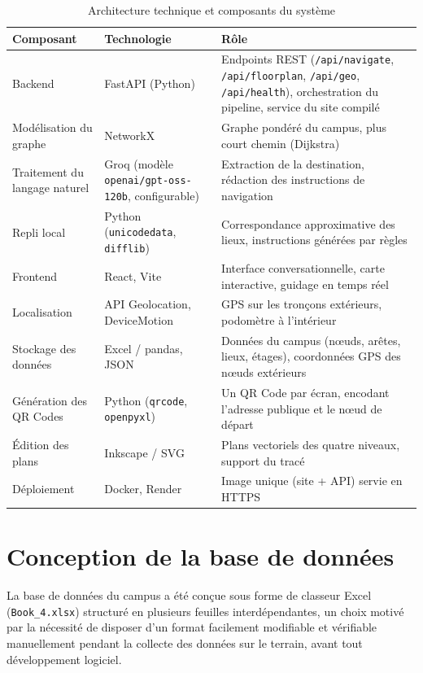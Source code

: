 \documentclass[12pt,a4paper]{report}
\begin{document}
\begin{table}[h]
\centering
\caption{Architecture technique et composants du système}
\label{tab:archi}
\small
\begin{tabularx}{\linewidth}{|p{3.4cm}|p{3.6cm}|X|}
\hline
\textbf{Composant} & \textbf{Technologie} & \textbf{Rôle}\\
\hline
Backend & FastAPI (Python) & Endpoints REST (\texttt{/api/navigate}, \texttt{/api/floorplan}, \texttt{/api/geo}, \texttt{/api/health}), orchestration du pipeline, service du site compilé\\
\hline
Modélisation du graphe & NetworkX & Graphe pondéré du campus, plus court chemin (Dijkstra)\\
\hline
Traitement du langage naturel & Groq (modèle \texttt{openai/gpt-oss-120b}, configurable) & Extraction de la destination, rédaction des instructions de navigation\\
\hline
Repli local & Python (\texttt{unicodedata}, \texttt{difflib}) & Correspondance approximative des lieux, instructions générées par règles\\
\hline
Frontend & React, Vite & Interface conversationnelle, carte interactive, guidage en temps réel\\
\hline
Localisation & API Geolocation, DeviceMotion & GPS sur les tronçons extérieurs, podomètre à l'intérieur\\
\hline
Stockage des données & Excel / pandas, JSON & Données du campus (nœuds, arêtes, lieux, étages), coordonnées GPS des nœuds extérieurs\\
\hline
Génération des QR Codes & Python (\texttt{qrcode}, \texttt{openpyxl}) & Un QR Code par écran, encodant l'adresse publique et le nœud de départ\\
\hline
Édition des plans & Inkscape / SVG & Plans vectoriels des quatre niveaux, support du tracé\\
\hline
Déploiement & Docker, Render & Image unique (site + API) servie en HTTPS\\
\hline
\end{tabularx}
\end{table}

\section{Conception de la base de données}
\label{sec:bdd}

La base de données du campus a été conçue sous forme de classeur Excel (\texttt{Book\_4.xlsx})
structuré en plusieurs feuilles interdépendantes, un choix motivé par la nécessité de disposer
d'un format facilement modifiable et vérifiable manuellement pendant la collecte des données sur le
terrain, avant tout développement logiciel.
\end{document}
